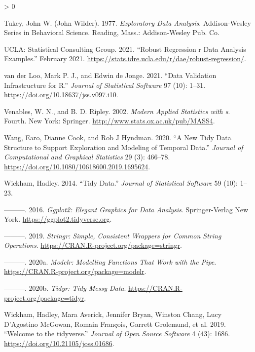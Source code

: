 \documentclass{article}
\newlength{\cslhangindent}
\newenvironment{CSLReferences}[2] %
 {%
  \setlength{\parindent}{0pt}
  \ifodd #1 \everypar{\setlength{\hangindent}{\cslhangindent}}\ignorespaces\fi
  \ifnum #2 > 0
  \setlength{\parskip}{#2\baselineskip}
  \fi
 }%
 {}
\begin{document}
\begin{CSLReferences}{1}{0}
\leavevmode\hypertarget{ref-tukey}{}%
Tukey, John W. (John Wilder). 1977. \emph{Exploratory Data Analysis}. Addison-Wesley Series in Behavioral Science. Reading, Mass.: Addison-Wesley Pub. Co.

\leavevmode\hypertarget{ref-rlm}{}%
UCLA: Statistical Consulting Group. 2021. {``Robust Regression \textbar{} r Data Analysis Examples.''} February 2021. \url{https://stats.idre.ucla.edu/r/dae/robust-regression/}.

\leavevmode\hypertarget{ref-validate}{}%
van der Loo, Mark P. J., and Edwin de Jonge. 2021. {``Data Validation Infrastructure for {R}.''} \emph{Journal of Statistical Software} 97 (10): 1--31. \url{https://doi.org/10.18637/jss.v097.i10}.

\leavevmode\hypertarget{ref-mass}{}%
Venables, W. N., and B. D. Ripley. 2002. \emph{Modern Applied Statistics with s}. Fourth. New York: Springer. \url{http://www.stats.ox.ac.uk/pub/MASS4}.

\leavevmode\hypertarget{ref-tsibble}{}%
Wang, Earo, Dianne Cook, and Rob J Hyndman. 2020. {``A New Tidy Data Structure to Support Exploration and Modeling of Temporal Data.''} \emph{Journal of Computational and Graphical Statistics} 29 (3): 466--78. \url{https://doi.org/10.1080/10618600.2019.1695624}.

\leavevmode\hypertarget{ref-WickhamHadley2014TD}{}%
Wickham, Hadley. 2014. {``Tidy Data.''} \emph{Journal of Statistical Software} 59 (10): 1--23.

\leavevmode\hypertarget{ref-ggplot2}{}%
---------. 2016. \emph{Ggplot2: Elegant Graphics for Data Analysis}. Springer-Verlag New York. \url{https://ggplot2.tidyverse.org}.

\leavevmode\hypertarget{ref-stringr}{}%
---------. 2019. \emph{Stringr: Simple, Consistent Wrappers for Common String Operations}. \url{https://CRAN.R-project.org/package=stringr}.

\leavevmode\hypertarget{ref-modelr}{}%
---------. 2020a. \emph{Modelr: Modelling Functions That Work with the Pipe}. \url{https://CRAN.R-project.org/package=modelr}.

\leavevmode\hypertarget{ref-tidyr}{}%
---------. 2020b. \emph{Tidyr: Tidy Messy Data}. \url{https://CRAN.R-project.org/package=tidyr}.

\leavevmode\hypertarget{ref-tidyverse}{}%
Wickham, Hadley, Mara Averick, Jennifer Bryan, Winston Chang, Lucy D'Agostino McGowan, Romain François, Garrett Grolemund, et al. 2019. {``Welcome to the {tidyverse}.''} \emph{Journal of Open Source Software} 4 (43): 1686. \url{https://doi.org/10.21105/joss.01686}.


\end{CSLReferences}
\end{document}
